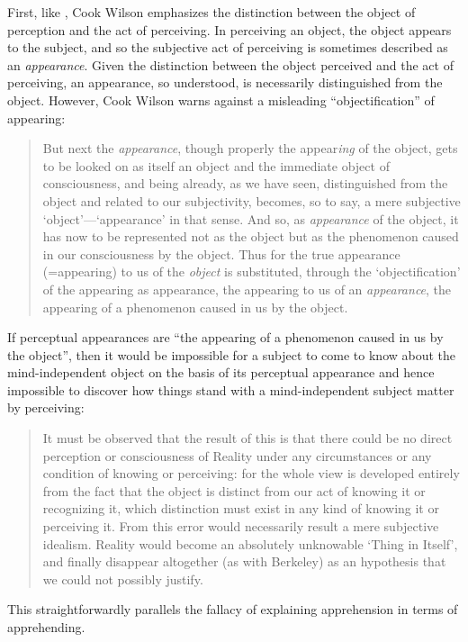 First, like \citet{Moore:1903uo}, Cook Wilson emphasizes the distinction between the object of perception and the act of perceiving. In perceiving an object, the object appears to the subject, and so the subjective act of perceiving is sometimes described as an \emph{appearance}. Given the distinction between the object perceived and the act of perceiving, an appearance, so understood, is necessarily distinguished from the object. However, Cook Wilson warns against a misleading ``objectification'' of appearing:
\begin{quote}
	But next the \emph{appearance}, though properly the appear\emph{ing} of the object, gets to be looked on as itself an object and the immediate object of consciousness, and being already, as we have seen, distinguished from the object and related to our subjectivity, becomes, so to say, a mere subjective `object'---`appearance' in that sense. And so, as \emph{appearance} of the object, it has now to be represented not as the object but as the phenomenon caused in our consciousness by the object. Thus for the true appearance (=appearing) to us of the \emph{object} is substituted, through the `objectification' of the appearing as appearance, the appearing to us of an \emph{appearance}, the appearing of a phenomenon caused in us by the object.  \citep[796]{Cook-Wilson:1926sf}
\end{quote}

If perceptual appearances are ``the appearing of a phenomenon caused in us by the object'', then it would be impossible for a subject to come to know about the mind-independent object on the basis of its perceptual appearance and hence impossible to discover how things stand with a mind-independent subject matter by perceiving:
\begin{quote}
	It must be observed that the result of this is that there could be no direct perception or consciousness of Reality under any circumstances or any condition of knowing or perceiving: for the whole view is developed entirely from the fact that the object is distinct from our act of knowing it or recognizing it, which distinction must exist in any kind of knowing it or perceiving it. From this error would necessarily result a mere subjective idealism. Reality would become an absolutely unknowable `Thing in Itself', and finally disappear altogether (as with Berkeley) as an hypothesis that we could not possibly justify. \citep[797]{Cook-Wilson:1926sf}
\end{quote}
This straightforwardly parallels the fallacy of explaining apprehension in terms of apprehending. 

